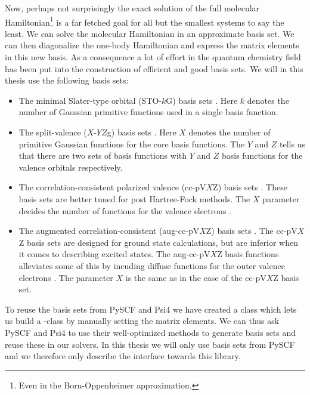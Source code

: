         Now, perhaps not surprisingly the exact solution of the full molecular
        Hamiltonian\footnote{%
            Even in the Born-Oppenheimer approximation.
        } is a far fetched goal for all but the smallest systems to say the
        least.
        We can solve the molecular Hamiltonian in an approximate basis set.
        We can then diagonalize the one-body Hamiltonian and express the
        matrix elements in this new basis.
        As a consequence a lot of effort in the quantum chemistry field has been
        put into the construction of efficient and good basis sets.
        We will in this thesis use the following basis sets:
        \begin{itemize}
            \item The minimal Slater-type orbital (STO-$k$G) basis sets
                \cite{sto-3g}.
                Here $k$ denotes the number of Gaussian primitive functions used
                in a single basis function.
            \item The split-valence ($X$-$YZ$g) basis sets \cite{x-yzg}.
                Here $X$ denotes the number of primitive Gaussian functions for
                the core basis functions.
                The $Y$ and $Z$ tells us that there are two sets of basis
                functions with $Y$ and $Z$ basis functions for the valence
                orbitals respectively.
            \item The correlation-consistent polarized valence (cc-pV$X$Z) basis
                sets \cite{cc-pVXZ}.
                These basis sets are better tuned for post Hartree-Fock methods.
                The $X$ parameter decides the number of functions for the
                valence electrons \cite{cc-pVXZ}.
            \item The augmented correlation-consistent (aug-cc-pV$X$Z) basis
                sets \cite{aug-cc-pVXZ}.
                The cc-pV$X$Z basis sets are designed for ground state
                calculations, but are inferior when it comes to describing
                excited states.
                The aug-cc-pV$X$Z basis functions alleviates some of this by
                incuding diffuse functions for the outer valence electrons
                \cite{helgaker-molecular}.
                The parameter $X$ is the same as in the case of the cc-pV$X$Z
                basis set.
        \end{itemize}
        To reuse the basis sets from PySCF \cite{pyscf} and Psi4 \cite{psi4}
        we have created a class  which lets us build a
        -class by manually setting the matrix elements.
        We can thus ask PySCF and Psi4 to use their well-optimized methods to
        generate basis sets and reuse these in our solvers.
        In this thesis we will only use basis sets from PySCF and we therefore
        only describe the interface towards this library.

